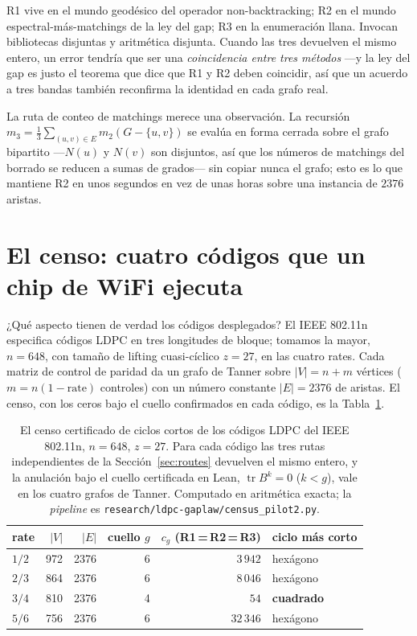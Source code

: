 \documentclass[11pt]{article}
\newcommand{\lean}[1]{\texttt{#1}}
\DeclareMathOperator{\tr}{tr}
\begin{document}
R1 vive en el mundo geodésico del operador non-backtracking; R2 en el mundo
espectral-más-matchings de la ley del gap; R3 en la enumeración llana. Invocan bibliotecas
disjuntas y aritmética disjunta. Cuando las tres devuelven el mismo entero, un error tendría
que ser una \emph{coincidencia entre tres métodos} ---y la ley del gap es justo el teorema que
dice que R1 y R2 deben coincidir, así que un acuerdo a tres bandas también reconfirma la
identidad en cada grafo real.

La ruta de conteo de matchings merece una observación. La recursión $m_3 = \tfrac13
\sum_{(u,v)\in E} m_2(G - \{u,v\})$ se evalúa en forma cerrada sobre el grafo bipartito
---$N(u)$ y $N(v)$ son disjuntos, así que los números de matchings del borrado se reducen a
sumas de grados--- sin copiar nunca el grafo; esto es lo que mantiene R2 en unos segundos en
vez de unas horas sobre una instancia de $2376$ aristas.

\section{El censo: cuatro códigos que un chip de WiFi ejecuta}
\label{sec:census}

¿Qué aspecto tienen de verdad los códigos desplegados? El IEEE 802.11n especifica códigos
LDPC en tres longitudes de bloque; tomamos la mayor, $n = 648$, con tamaño de lifting
cuasi-cíclico $z = 27$, en las cuatro rates. Cada matriz de control de paridad da un grafo de
Tanner sobre $|V| = n + m$ vértices ($m = n(1-\text{rate})$ controles) con un número
constante $|E| = 2376$ de aristas. El censo, con los ceros bajo el cuello confirmados en cada
código, es la Tabla~\ref{tab:census}.

\begin{table}[h]
\centering\small
{}
\begin{tabular}{@{}lrrrrl@{}}
\toprule
\rowcolor{ggteal!18} rate & $|V|$ & $|E|$ & cuello $g$ & $c_g$ (R1\,=\,R2\,=\,R3) & ciclo más corto \\
\midrule
$1/2$ & 972 & 2376 & 6 & $3\,942$  & hexágono \\
$2/3$ & 864 & 2376 & 6 & $8\,046$  & hexágono \\
$3/4$ & 810 & 2376 & 4 & $54$      & \textbf{cuadrado} \\
$5/6$ & 756 & 2376 & 6 & $32\,346$ & hexágono \\
\bottomrule
\end{tabular}
\caption{El censo certificado de ciclos cortos de los códigos LDPC del IEEE 802.11n,
$n = 648$, $z = 27$. Para cada código las tres rutas independientes de la
Sección~\ref{sec:routes} devuelven el mismo entero, y la anulación bajo el cuello certificada
en Lean, $\tr B^k = 0$ ($k < g$), vale en los cuatro grafos de Tanner. Computado en
aritmética exacta; la \emph{pipeline} es \lean{research/ldpc-gaplaw/census\_pilot2.py}.}
\label{tab:census}
\end{table}
\end{document}
